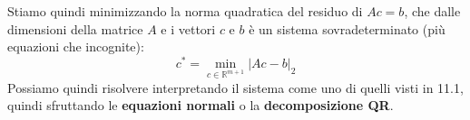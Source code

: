 \documentclass[a4paper,11pt]{article}
\begin{document}
Stiamo quindi minimizzando la norma quadratica del residuo di $Ac = b$, che dalle dimensioni della matrice $A$ e i vettori $c$ e $b$ è un sistema sovradeterminato (più equazioni che incognite):
$$
c^* = \min_{c \in \mathbb{R}^{m + 1}} |Ac - b|_2
$$
Possiamo quindi risolvere interpretando il sistema come uno di quelli visti in 11.1, quindi sfruttando le \textbf{equazioni normali} o la \textbf{decomposizione QR}.
\end{document}
